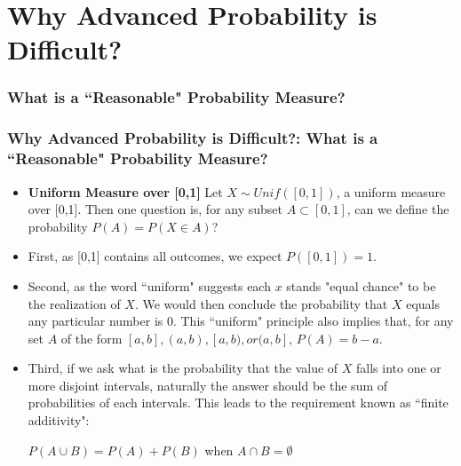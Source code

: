 \documentclass[handout]{beamer}
\begin{document}
\section{Why Advanced Probability is Difficult?}
\subsubsection{What is a ``Reasonable" Probability Measure?} 

\frame
{
  \frametitle{Why Advanced Probability is Difficult?: What is a ``Reasonable" Probability Measure? }

   \begin{itemize}
   
 
  \item<1-> \textbf{Uniform Measure over [0,1]}  Let $X\sim Unif ([0,1])$, a uniform measure over [0,1]. Then one question is, for any subset $A\subset [0,1]$, can we define the probability $P(A)=P(X\in A)$?
  
 \item<2-> First, as [0,1] contains all outcomes, we expect $P([0,1])=1$. 

 
 
 \item<3-> Second, as the word ``uniform" suggests  each $x$ stands "equal chance" to be the realization of $X$. We would then conclude the probability that $X$ equals any particular number is $0$. This ``uniform" principle also implies that, for any set $A$ of the form $[a,b], (a,b), [a,b), or (a, b]$, $P( A)=b-a$.
 
 
\item<4-> Third, if we ask what is the probability that the value of $X$ falls into one or more disjoint intervals, naturally the answer should be the sum of probabilities of each intervals. This leads to the requirement known as ``finite additivity":
  
$P(A\cup B)=P(A)+P(B)$ when $A \cap B = \emptyset$
  \end{itemize}
}
\end{document}
